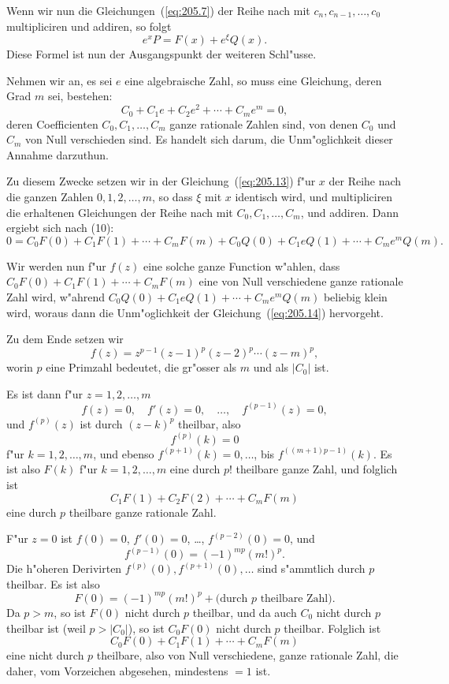 \documentclass[10pt,a4paper]{article}
\theoremstyle{weberstyle}
\begin{document}
Wenn wir nun die Gleichungen~(\ref{eq:205.7}) der Reihe nach mit
$c_n,c_{n-1},\dots,c_0$ multipliciren und addiren, so folgt
\begin{equation}\label{eq:205.13}
e^x P = F(x) + e^\xi Q(x).
\end{equation}
Diese Formel ist nun der Ausgangspunkt der weiteren Schl"usse.

Nehmen wir an, es sei $e$ eine algebraische Zahl, so muss eine Gleichung,
deren Grad $m$ sei, bestehen:
\begin{equation}\label{eq:205.14}
C_0 + C_1e + C_2e^2 + \cdots + C_me^m = 0,
\end{equation}
deren Coefficienten $C_0,C_1,\dots,C_m$ ganze rationale Zahlen sind, von
denen $C_0$ und $C_m$ von Null verschieden sind. Es handelt sich darum,
die Unm"oglichkeit dieser Annahme darzuthun.

Zu diesem Zwecke setzen wir in der Gleichung~(\ref{eq:205.13}) f"ur $x$
der Reihe nach die ganzen Zahlen $0,1,2,\dots,m$, so dass $\xi$ mit $x$
identisch wird, und multipliciren die erhaltenen Gleichungen der Reihe
nach mit $C_0,C_1,\dots,C_m$, und addiren. Dann ergiebt sich nach
(10):
\begin{equation}\label{eq:205.15}
0 = C_0F(0)+C_1F(1)+\cdots+C_mF(m) +
C_0Q(0)+C_1eQ(1)+\cdots+C_me^mQ(m).
\end{equation}

Wir werden nun f"ur $f(z)$ eine solche ganze Function w"ahlen, dass
$C_0F(0)+C_1F(1)+\cdots+C_mF(m)$ eine von Null verschiedene ganze rationale
Zahl wird, w"ahrend $C_0Q(0)+C_1eQ(1)+\cdots+C_me^mQ(m)$ beliebig klein
wird, woraus dann die Unm"oglichkeit der Gleichung~(\ref{eq:205.14})
hervorgeht.

Zu dem Ende setzen wir
\begin{equation}\label{eq:205.16}
f(z) = z^{p-1}(z-1)^p(z-2)^p\cdots(z-m)^p,
\end{equation}
worin $p$ eine Primzahl bedeutet, die gr"osser als $m$ und als
$|C_0|$ ist.

Es ist dann f"ur $z=1,2,\dots,m$
\[
f(z)=0,\quad f'(z)=0,\quad\dots,\quad f^{(p-1)}(z)=0,
\]
und $f^{(p)}(z)$ ist durch $(z-k)^p$ theilbar, also
\[
f^{(p)}(k)=0
\]
f"ur $k=1,2,\dots,m$, und ebenso $f^{(p+1)}(k)=0,\dots$, bis
$f^{((m+1)p-1)}(k)$. Es ist also $F(k)$ f"ur $k=1,2,\dots,m$ eine durch
$p!$ theilbare ganze Zahl, und folglich ist
\[
C_1F(1)+C_2F(2)+\cdots+C_mF(m)
\]
eine durch $p$ theilbare ganze rationale Zahl.

F"ur $z=0$ ist $f(0)=0$, $f'(0)=0$, \dots, $f^{(p-2)}(0)=0$, und
\[
f^{(p-1)}(0) = (-1)^{mp}(m!)^p.
\]
Die h"oheren Derivirten $f^{(p)}(0),f^{(p+1)}(0),\dots$ sind s"ammtlich
durch $p$ theilbar. Es ist also
\[
F(0) = (-1)^{mp}(m!)^p + \text{(durch }p\text{ theilbare Zahl)}.
\]
Da $p>m$, so ist $F(0)$ nicht durch $p$ theilbar, und da auch $C_0$ nicht
durch $p$ theilbar ist (weil $p>|C_0|$), so ist $C_0F(0)$ nicht durch $p$
theilbar. Folglich ist
\[
C_0F(0)+C_1F(1)+\cdots+C_mF(m)
\]
eine nicht durch $p$ theilbare, also von Null verschiedene, ganze rationale
Zahl, die daher, vom Vorzeichen abgesehen, mindestens $=1$ ist.
\end{document}
